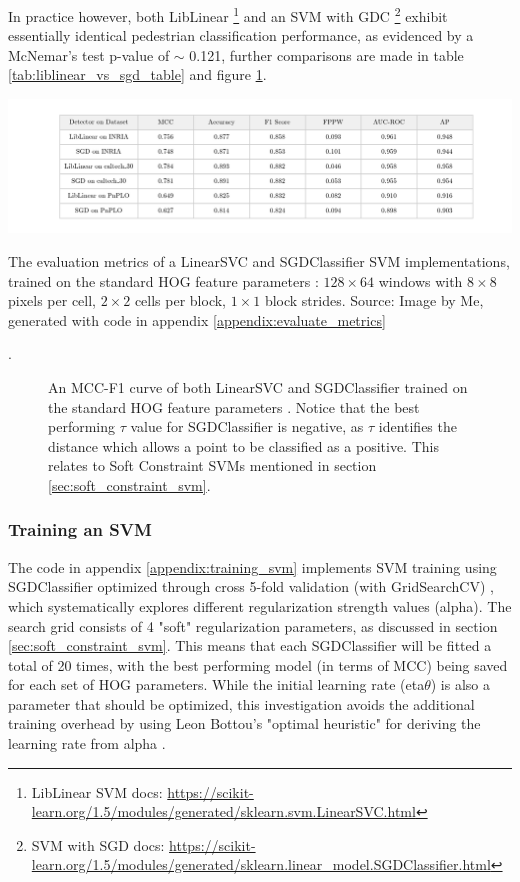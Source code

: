 In practice however, both LibLinear \footnote{LibLinear SVM docs: \url{https://scikit-learn.org/1.5/modules/generated/sklearn.svm.LinearSVC.html}} and an SVM with GDC \footnote{SVM with SGD docs: \url{https://scikit-learn.org/1.5/modules/generated/sklearn.linear_model.SGDClassifier.html}} exhibit essentially identical pedestrian classification performance, as evidenced by a McNemar's test p-value of $\sim$ 0.121, further comparisons are made in table \ref{tab:liblinear_vs_sgd_table} and figure \ref{fig:liblinear_vs_sgd_curve}.

\begin{table}
    \includegraphics[width=\linewidth]{images/liblinear_vs_sgd_table.png}
    \caption{The evaluation metrics of a LinearSVC and SGDClassifier SVM implementations, trained on the standard HOG feature parameters \cite{dalal_2005_histograms}: $128\times64$ windows with $8\times8$ pixels per cell, $2\times2$ cells per block, $1\times1$ block strides. Source: Image by Me, generated with code in appendix \ref{appendix:evaluate_metrics}}
    \label{tab:liblinear_vs_sgd_table}. 
\end{table}


\begin{figure}
    \centering
    
    \caption{An MCC-F1 curve of both LinearSVC and SGDClassifier trained on the standard HOG feature parameters \cite{dalal_2005_histograms}. Notice that the best performing $\tau$ value for SGDClassifier is negative, as $\tau$ identifies the distance which allows a point to be classified as a positive. This relates to Soft Constraint SVMs mentioned in section \ref{sec:soft_constraint_svm}.}
    \label{fig:liblinear_vs_sgd_curve}
\end{figure}

\subsubsection{Training an SVM}

The code in appendix \ref{appendix:training_svm} implements SVM training using SGDClassifier optimized through cross 5-fold validation (with GridSearchCV) \cite{cornell_hyperoptimization}, which systematically explores different regularization strength values (alpha). The search grid consists of 4 "soft" regularization parameters, as discussed in section \ref{sec:soft_constraint_svm}. This means that each SGDClassifier will be fitted a total of 20 times, with the best performing model (in terms of MCC) being saved for each set of HOG parameters. While the initial learning rate (eta$\theta$) is also a parameter that should be optimized, this investigation avoids the additional training overhead by using Leon Bottou's "optimal heuristic" for deriving the learning rate from alpha \cite{sgd_leon}.

